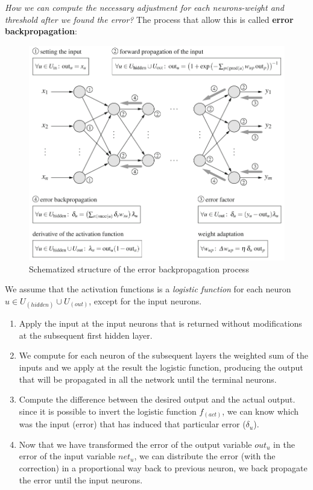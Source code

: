 \documentclass{article}
\begin{document}
\noindent\textit{How we can compute the necessary adjustment for each
    neurons-weight and threshold after we found the error?}
\newline
The process that allow this is called \textbf{error backpropagation}:
\begin{figure}[H]
    \centering
    \includegraphics[scale=0.5]{images/error_backpropagation.png}
    \caption{Schematized structure of the error backpropagation process}
    \label{fig:error_backpropagation}
\end{figure}

We assume that the activation functions is a \textit{logistic function} for each neuron
$u\in U_{(hidden)}\cup U_{(out)}$, except for the input neurons.
\begin{enumerate}
    \item Apply the input at the input neurons that is returned without modifications
          at the subsequent first hidden layer.
    \item We compute for each neuron of the subsequent layers the weighted sum of the
          inputs and we apply at the result the logistic function, producing the output
          that will be propagated in all the network until the terminal neurons.
    \item Compute the difference between the desired output and the actual output. since
          it is possible to invert the logistic function $f_{(act)}$, we can know which was
          the input (error) that has induced that particular error ($\delta_u$).
    \item Now that we have transformed the error of the output variable $out_u$ in
          the error of the input variable $net_u$, we can distribute the error (with the correction)
          in a proportional way back to previous neuron, we back propagate the error until the
          input neurons.
\end{enumerate}
\end{document}
